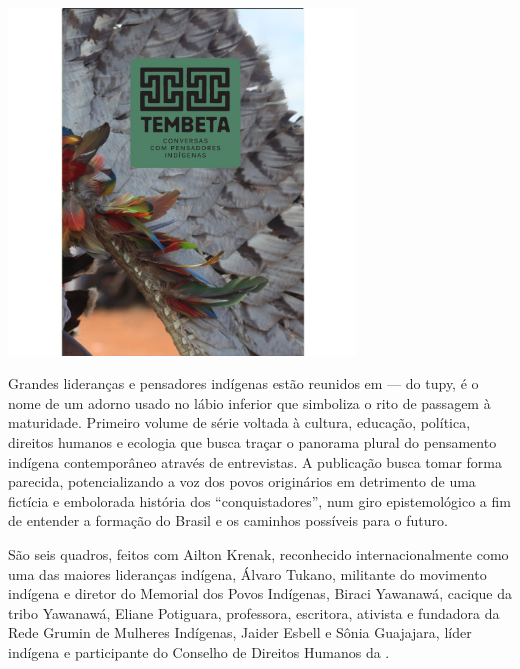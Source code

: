 \begin{center}
\hspace*{-2.5cm}
\hspace*{2.5cm}\includegraphics[width=92mm]{./grid/tembeta.jpg}
\end{center}

\hspace*{-7cm}\hrulefill\hspace*{-7cm}

\medskip

\noindent{}Grandes lideranças e pensadores indígenas estão reunidos em {} --- do tupy, é o nome de um adorno usado no lábio inferior que simboliza o rito de passagem à maturidade. Primeiro volume de série voltada à cultura, educação, política, direitos humanos e ecologia que busca traçar o panorama plural do pensamento indígena contemporâneo através de entrevistas. A publicação busca tomar forma parecida, potencializando a voz dos povos originários em detrimento de uma fictícia e embolorada história dos “conquistadores”, num giro epistemológico a fim de entender a formação do Brasil e os caminhos possíveis para o futuro.

São seis quadros, feitos com Ailton Krenak, reconhecido internacionalmente como uma das maiores lideranças indígena, Álvaro Tukano, militante do movimento indígena e diretor do Memorial dos Povos Indígenas, Biraci Yawanawá, cacique da tribo Yawanawá, Eliane Potiguara, professora, escritora, ativista e fundadora da Rede Grumin de Mulheres Indígenas, Jaider Esbell e Sônia Guajajara, líder indígena e participante do Conselho de Direitos Humanos da .


